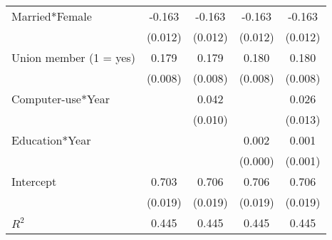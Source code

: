 \begin{tabular}{l*{4}{c}}
Married*Female&      -0.163&      -0.163&      -0.163&      -0.163\\
            &     (0.012)&     (0.012)&     (0.012)&     (0.012)\\
Union member (1 = yes)&       0.179&       0.179&       0.180&       0.180\\
            &     (0.008)&     (0.008)&     (0.008)&     (0.008)\\
Computer-use*Year&            &       0.042&            &       0.026\\
            &            &     (0.010)&            &     (0.013)\\
Education*Year&            &            &       0.002&       0.001\\
            &            &            &     (0.000)&     (0.001)\\
Intercept   &       0.703&       0.706&       0.706&       0.706\\
            &     (0.019)&     (0.019)&     (0.019)&     (0.019)\\
\hline
\(R^{2}\)   &       0.445&       0.445&       0.445&       0.445\\
\hline\hline
\end{tabular}
